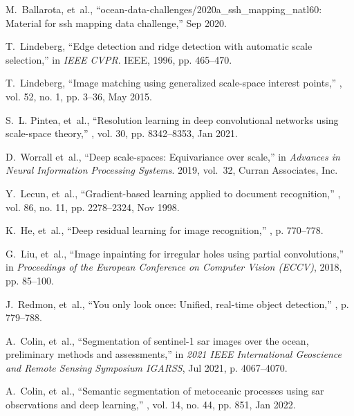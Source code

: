 \begin{bibunit}
\begin{thebibliography}{10}
M.~Ballarota, et~al.,
\newblock ``ocean-data-challenges/2020a\_ssh\_mapping\_natl60: Material for ssh
  mapping data challenge,'' Sep 2020.

T.~Lindeberg,
\newblock ``Edge detection and ridge detection with automatic scale
  selection,''
\newblock in {\em IEEE CVPR}. IEEE, 1996, pp. 465--470.

T.~Lindeberg,
\newblock ``Image matching using generalized scale-space interest points,''
, vol. 52, no. 1, pp.
  3–36, May 2015.

S.~L. Pintea, et~al.,
\newblock ``Resolution learning in deep convolutional networks using
  scale-space theory,''
, vol. 30, pp.
  8342–8353, Jan 2021.

D.~Worrall et~al.,
\newblock ``Deep scale-spaces: Equivariance over scale,''
\newblock in {\em Advances in Neural Information Processing Systems}. 2019,
  vol.~32, Curran Associates, Inc.

Y.~Lecun, et~al.,
\newblock ``Gradient-based learning applied to document recognition,''
, vol. 86, no. 11, pp. 2278–2324, Nov
  1998.

K.~He, et~al.,
\newblock ``Deep residual learning for image recognition,''
, p. 770–778.

G.~Liu, et~al.,
\newblock ``Image inpainting for irregular holes using partial convolutions,''
\newblock in {\em Proceedings of the {European} {Conference} on {Computer}
  {Vision} ({ECCV})}, 2018, pp. 85--100.

J.~Redmon, et~al.,
\newblock ``You only look once: Unified, real-time object detection,''
, p. 779–788.

A.~Colin, et~al.,
\newblock ``Segmentation of sentinel-1 sar images over the ocean, preliminary
  methods and assessments,''
\newblock in {\em 2021 IEEE International Geoscience and Remote Sensing
  Symposium IGARSS}, Jul 2021, p. 4067–4070.

A.~Colin, et~al.,
\newblock ``Semantic segmentation of metoceanic processes using sar
  observations and deep learning,''
, vol. 14, no. 44, pp. 851, Jan 2022.


\end{thebibliography}
\end{bibunit}
